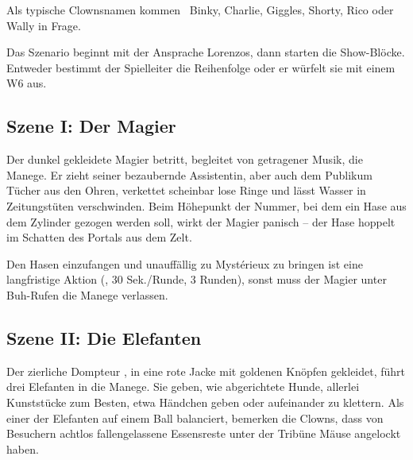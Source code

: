 {		

		\noindent
		Als typische Clownsnamen kommen \zB~Binky, Charlie, Giggles, Shorty, Rico oder Wally in Frage.


		\noindent
		Das Szenario beginnt mit der Ansprache Lorenzos, dann starten die Show-Blöcke. Entweder bestimmt der Spielleiter die Reihenfolge oder er würfelt sie mit einem W6 aus.

		\subsection{Szene I: Der Magier}

		Der dunkel gekleidete Magier  betritt, begleitet von getragener Musik, die Manege. Er zieht seiner bezaubernde Assistentin, aber auch dem Publikum Tücher aus den Ohren, verkettet scheinbar lose Ringe und lässt Wasser in Zeitungstüten verschwinden. Beim Höhepunkt der Nummer, bei dem ein Hase aus dem Zylinder gezogen werden soll, wirkt der Magier panisch -- der Hase  hoppelt im Schatten des Portals aus dem Zelt.

		Den Hasen einzufangen und unauffällig zu Mystérieux zu bringen ist eine langfristige Aktion (, 30 Sek./Runde, 3 Runden), sonst muss der Magier unter Buh-Rufen die Manege verlassen.

		\subsection{Szene II: Die Elefanten}

		Der zierliche Dompteur , in eine rote Jacke mit goldenen Knöpfen gekleidet, führt drei Elefanten in die Manege. Sie geben, wie abgerichtete Hunde, allerlei Kunststücke zum Besten, etwa Händchen geben oder aufeinander zu klettern. Als einer der Elefanten auf einem Ball balanciert, bemerken die Clowns, dass von Besuchern achtlos fallengelassene Essensreste unter der Tribüne Mäuse angelockt haben.

}
